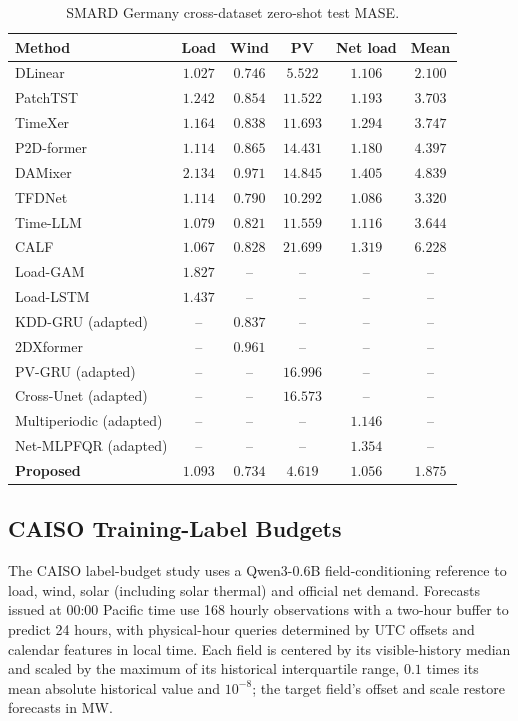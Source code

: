 \documentclass[journal]{IEEEtran}
\begin{document}
\begin{table}[!t]
\caption{SMARD Germany cross-dataset zero-shot test MASE.}
\label{tab:smard_zero_shot}
\centering\footnotesize
\setlength{\tabcolsep}{2pt}
\renewcommand{\arraystretch}{1.10}
\begin{tabular*}{\columnwidth}{@{\extracolsep{\fill}}lccccc@{}}
\toprule
Method & Load & Wind & PV & Net load & Mean \\
\midrule
DLinear & $\boldsymbol{1.027}$ & $0.746$ & $5.522$ & $1.106$ & $2.100$ \\
PatchTST & $1.242$ & $0.854$ & $11.522$ & $1.193$ & $3.703$ \\
TimeXer & $1.164$ & $0.838$ & $11.693$ & $1.294$ & $3.747$ \\
P2D-former & $1.114$ & $0.865$ & $14.431$ & $1.180$ & $4.397$ \\
DAMixer & $2.134$ & $0.971$ & $14.845$ & $1.405$ & $4.839$ \\
TFDNet & $1.114$ & $0.790$ & $10.292$ & $1.086$ & $3.320$ \\
Time-LLM & $1.079$ & $0.821$ & $11.559$ & $1.116$ & $3.644$ \\
CALF & $1.067$ & $0.828$ & $21.699$ & $1.319$ & $6.228$ \\
Load-GAM & $1.827$ & -- & -- & -- & -- \\
Load-LSTM & $1.437$ & -- & -- & -- & -- \\
KDD-GRU (adapted) & -- & $0.837$ & -- & -- & -- \\
2DXformer & -- & $0.961$ & -- & -- & -- \\
PV-GRU (adapted) & -- & -- & $16.996$ & -- & -- \\
Cross-Unet (adapted) & -- & -- & $16.573$ & -- & -- \\
Multiperiodic (adapted) & -- & -- & -- & $1.146$ & -- \\
Net-MLPFQR (adapted) & -- & -- & -- & $1.354$ & -- \\
\midrule
\textbf{Proposed} & $1.093$ & $\boldsymbol{0.734}$ & $\boldsymbol{4.619}$ & $\boldsymbol{1.056}$ & $\boldsymbol{1.875}$ \\
\bottomrule
\end{tabular*}
\end{table}

\subsection{CAISO Training-Label Budgets}
\label{sec:caiso_target_only}

The CAISO label-budget study uses a Qwen3-0.6B field-conditioning reference to load, wind, solar (including solar thermal) and official net demand. Forecasts issued at 00:00 Pacific time use 168 hourly observations with a two-hour buffer to predict 24 hours, with physical-hour queries determined by UTC offsets and calendar features in local time. Each field is centered by its visible-history median and scaled by the maximum of its historical interquartile range, $0.1$ times its mean absolute historical value and $10^{-8}$; the target field's offset and scale restore forecasts in MW.
\end{document}
